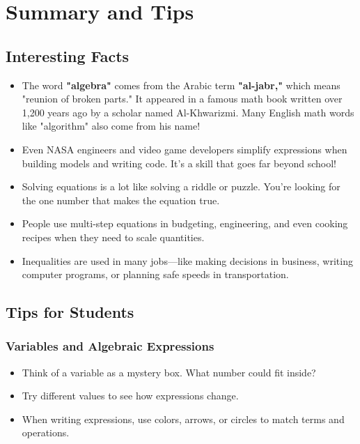 \cleardoublepage
\section{Summary and Tips}

\subsection*{Interesting Facts}

\begin{itemize}
  \item The word \textbf{"algebra"} comes from the Arabic term \textbf{"al-jabr,"} which means "reunion of broken parts." It appeared in a famous math book written over 1,200 years ago by a scholar named Al-Khwarizmi. Many English math words like "algorithm" also come from his name!
  \item Even NASA engineers and video game developers simplify expressions when building models and writing code. It's a skill that goes far beyond school!
  \item Solving equations is a lot like solving a riddle or puzzle. You're looking for the one number that makes the equation true.
  \item People use multi-step equations in budgeting, engineering, and even cooking recipes when they need to scale quantities.
  \item Inequalities are used in many jobs—like making decisions in business, writing computer programs, or planning safe speeds in transportation.
\end{itemize}

\subsection*{Tips for Students}

\subsubsection*{Variables and Algebraic Expressions}
\begin{itemize}
  \item Think of a variable as a mystery box. What number could fit inside?
  \item Try different values to see how expressions change.
  \item When writing expressions, use colors, arrows, or circles to match terms and operations.
\end{itemize}

